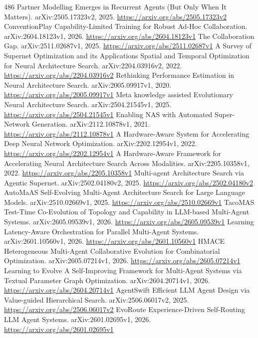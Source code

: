 \documentclass[11pt]{article}
\begin{document}
\begin{thebibliography}{486}
 Partner Modelling Emerges in Recurrent Agents (But Only When It Matters). arXiv:2505.17323v2, 2025. \url{https://arxiv.org/abs/2505.17323v2}
 ConventionPlay Capability-Limited Training for Robust Ad-Hoc Collaboration. arXiv:2604.18123v1, 2026. \url{https://arxiv.org/abs/2604.18123v1}
 The Collaboration Gap. arXiv:2511.02687v1, 2025. \url{https://arxiv.org/abs/2511.02687v1}
 A Survey of Supernet Optimization and its Applications Spatial and Temporal Optimization for Neural Architecture Search. arXiv:2204.03916v2, 2022. \url{https://arxiv.org/abs/2204.03916v2}
 Rethinking Performance Estimation in Neural Architecture Search. arXiv:2005.09917v1, 2020. \url{https://arxiv.org/abs/2005.09917v1}
 Meta knowledge assisted Evolutionary Neural Architecture Search. arXiv:2504.21545v1, 2025. \url{https://arxiv.org/abs/2504.21545v1}
 Enabling NAS with Automated Super-Network Generation. arXiv:2112.10878v1, 2021. \url{https://arxiv.org/abs/2112.10878v1}
 A Hardware-Aware System for Accelerating Deep Neural Network Optimization. arXiv:2202.12954v1, 2022. \url{https://arxiv.org/abs/2202.12954v1}
 A Hardware-Aware Framework for Accelerating Neural Architecture Search Across Modalities. arXiv:2205.10358v1, 2022. \url{https://arxiv.org/abs/2205.10358v1}
 Multi-agent Architecture Search via Agentic Supernet. arXiv:2502.04180v2, 2025. \url{https://arxiv.org/abs/2502.04180v2}
 AutoMaAS Self-Evolving Multi-Agent Architecture Search for Large Language Models. arXiv:2510.02669v1, 2025. \url{https://arxiv.org/abs/2510.02669v1}
 TacoMAS Test-Time Co-Evolution of Topology and Capability in LLM-based Multi-Agent Systems. arXiv:2605.09539v1, 2026. \url{https://arxiv.org/abs/2605.09539v1}
 Learning Latency-Aware Orchestration for Parallel Multi-Agent Systems. arXiv:2601.10560v1, 2026. \url{https://arxiv.org/abs/2601.10560v1}
 HMACE Heterogeneous Multi-Agent Collaborative Evolution for Combinatorial Optimization. arXiv:2605.07214v1, 2026. \url{https://arxiv.org/abs/2605.07214v1}
 Learning to Evolve A Self-Improving Framework for Multi-Agent Systems via Textual Parameter Graph Optimization. arXiv:2604.20714v1, 2026. \url{https://arxiv.org/abs/2604.20714v1}
 AgentSwift Efficient LLM Agent Design via Value-guided Hierarchical Search. arXiv:2506.06017v2, 2025. \url{https://arxiv.org/abs/2506.06017v2}
 EvoRoute Experience-Driven Self-Routing LLM Agent Systems. arXiv:2601.02695v1, 2026. \url{https://arxiv.org/abs/2601.02695v1}

\end{thebibliography}
\end{document}
